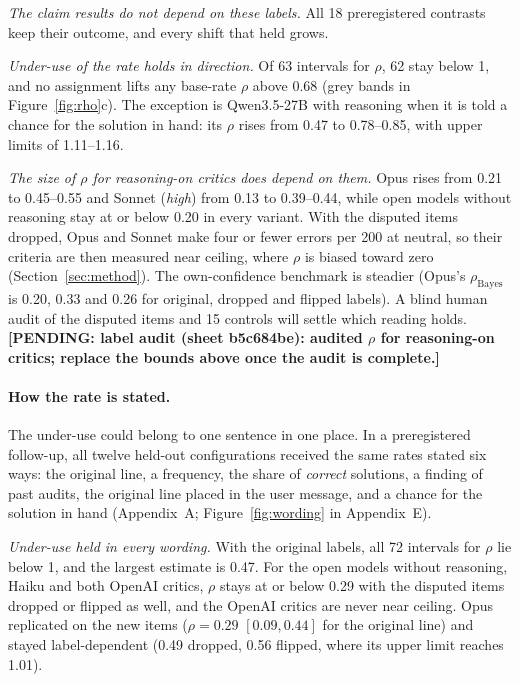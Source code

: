 \documentclass[letterpaper]{article} %
\newcommand{\pending}[1]{\textbf{[PENDING: #1]}}
\begin{document}
\emph{The claim results do not depend on these labels.} All 18 preregistered contrasts keep their outcome, and every shift that held grows.

\emph{Under-use of the rate holds in direction.} Of 63 intervals for $\rho$, 62 stay below 1, and no assignment lifts any base-rate $\rho$ above 0.68 (grey bands in Figure~\ref{fig:rho}c). The exception is Qwen3.5-27B with reasoning when it is told a chance for the solution in hand: its $\rho$ rises from 0.47 to 0.78--0.85, with upper limits of 1.11--1.16.

\emph{The size of $\rho$ for reasoning-on critics does depend on them.} Opus rises from 0.21 to 0.45--0.55 and Sonnet (\emph{high}) from 0.13 to 0.39--0.44, while open models without reasoning stay at or below 0.20 in every variant. With the disputed items dropped, Opus and Sonnet make four or fewer errors per 200 at neutral, so their criteria are then measured near ceiling, where $\rho$ is biased toward zero (Section~\ref{sec:method}). The own-confidence benchmark is steadier (Opus's $\rho_{\mathrm{Bayes}}$ is 0.20, 0.33 and 0.26 for original, dropped and flipped labels). A blind human audit of the disputed items and 15 controls will settle which reading holds. \pending{label audit (sheet b5c684be): audited $\rho$ for reasoning-on critics; replace the bounds above once the audit is complete.}

\paragraph{How the rate is stated.} The under-use could belong to one sentence in one place. In a preregistered follow-up, all twelve held-out configurations received the same rates stated six ways: the original line, a frequency, the share of \emph{correct} solutions, a finding of past audits, the original line placed in the user message, and a chance for the solution in hand (Appendix~A; Figure~\ref{fig:wording} in Appendix~E).

\emph{Under-use held in every wording.} With the original labels, all 72 intervals for $\rho$ lie below 1, and the largest estimate is 0.47. For the open models without reasoning, Haiku and both OpenAI critics, $\rho$ stays at or below 0.29 with the disputed items dropped or flipped as well, and the OpenAI critics are never near ceiling. Opus replicated on the new items ($\rho=0.29$ $[0.09, 0.44]$ for the original line) and stayed label-dependent (0.49 dropped, 0.56 flipped, where its upper limit reaches 1.01).
\end{document}

